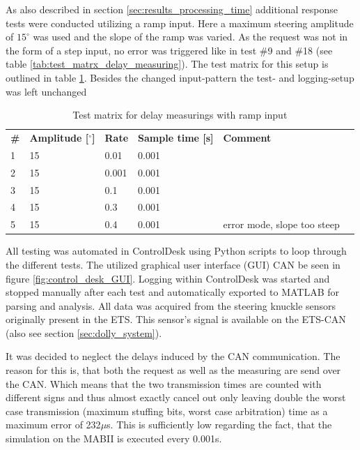 \documentclass[ExampleMasters.tex]{subfiles}
\begin{document}


As also described in section \ref{sec:results_processing_time} additional response tests were conducted utilizing a ramp input. Here a maximum steering amplitude of $15^\circ $ was used and the slope of the ramp was varied. As the request was not in the form of a step input, no error was triggered like in test \#9 and \#18 (see table \ref{tab:test_matrx_delay_measuring}). The test matrix for this setup is outlined in table \ref{tab:test_matrx_ramp_input}. Besides the changed input-pattern the test- and logging-setup was left unchanged

\begin{table}[h]
	
	\centering
\begin{tabular}{llllll}

 \textbf{\#} &\textbf{ Amplitude [$^\circ$]} & \textbf{Rate} & \textbf{Sample time [s]} & \textbf{Comment} &  \\ 
1	  &  15 & 0.01 & 0.001 &   \\ 
2	  & 15 & 0.001 &  0.001&  \\ 
3	  & 15 & 0.1 &  0.001&   \\ 
4	  & 15 & 0.3 & 	 0.001&   \\ 
5	  & 15 & 0.4 & 0.001 &  error mode, slope too steep\\ 

\end{tabular} 
\caption{Test matrix for delay measurings with ramp input}
\label{tab:test_matrx_ramp_input}	
\end{table}


All testing was automated in ControlDesk using Python scripts to loop through the different tests. The utilized graphical user interface (GUI) \gls{CAN} be seen in figure \ref{fig:control_desk_GUI}. Logging within ControlDesk was started and stopped manually after each test and automatically exported to MATLAB for parsing and analysis. All data was acquired from the steering knuckle sensors originally present in the \gls{ETS}. This sensor's signal is available on the \gls{ETS}-\gls{CAN} (also see section \ref{sec:dolly_system}). 

It was decided to neglect the delays induced by the \gls{CAN} communication. The reason for this is, that both the request as well as the measuring are send over the \gls{CAN}. Which means that the two transmission times are counted with different signs and thus almost exactly cancel out only leaving double the worst case transmission (maximum stuffing bits, worst case arbitration) time as a maximum error of 232$\mu$s. This is sufficiently low regarding the fact, that the simulation on the \gls{MABII} is executed every 0.001s.     
\end{document}
